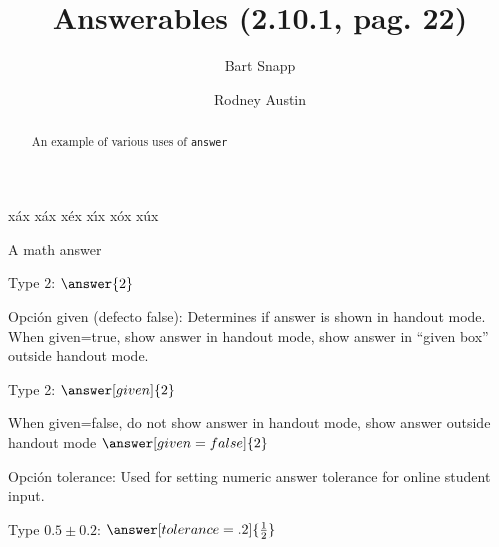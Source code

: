 \documentclass{ximera}
\title[Examples:]{Answerables (2.10.1, pag. 22)}
\author{Bart Snapp \and Rodney Austin}
\begin{document}
\begin{abstract}
  An example of various uses of \texttt{answer}
\end{abstract}
\maketitle

x\'ax x\'{a}x x\'{e}x x\'{\i}x x\'{o}x x\'{u}x

A math answer

Type $2$: $\answer{2}$

Opci{\'{o}}n  {\ttfamily given} (defecto false): Determines if answer is shown in handout mode. 
When given=true, show answer in handout mode, show answer in ``given box'' outside handout mode. 

Type 2: $\answer[given]{2}$

When given=false, do not show answer in handout mode, show answer outside handout mode  
$\answer[given=false]{2}$

Opci\'{o}n {\ttfamily tolerance}: Used for setting numeric answer tolerance for online student input.

Type $0.5\pm 0.2$: $\answer[tolerance=.2]{\frac{1}{2}}$
\end{document}
